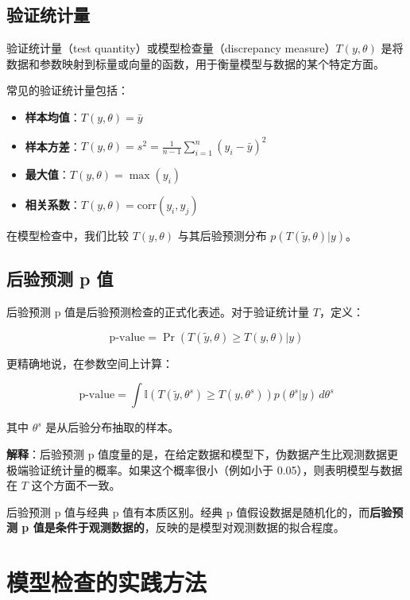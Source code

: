 \subsection{验证统计量}

验证统计量（test quantity）或模型检查量（discrepancy measure）$T(y, \theta)$ 是将数据和参数映射到标量或向量的函数，用于衡量模型与数据的某个特定方面。

常见的验证统计量包括：

\begin{itemize}
  \item \textbf{样本均值}：$T(y, \theta) = \bar{y}$
  \item \textbf{样本方差}：$T(y, \theta) = s^2 = \frac{1}{n-1}\sum_{i=1}^n (y_i - \bar{y})^2$
  \item \textbf{最大值}：$T(y, \theta) = \max(y_i)$
  \item \textbf{相关系数}：$T(y, \theta) = \text{corr}(y_i, y_j)$
\end{itemize}

在模型检查中，我们比较 $T(y, \theta)$ 与其后验预测分布 $p(T(\tilde{y}, \theta) | y)$。

\subsection{后验预测 p 值}

后验预测 p 值是后验预测检查的正式化表述。对于验证统计量 $T$，定义：

\[
\text{p-value} = \Pr(T(\tilde{y}, \theta) \geq T(y, \theta) | y)
\]

更精确地说，在参数空间上计算：

\[
\text{p-value} = \int \mathbb{I}(T(\tilde{y}, \theta^s) \geq T(y, \theta^s)) p(\theta^s | y) \, d\theta^s
\]

其中 $\theta^s$ 是从后验分布抽取的样本。

\textbf{解释}：后验预测 p 值度量的是，在给定数据和模型下，伪数据产生比观测数据更极端验证统计量的概率。如果这个概率很小（例如小于 0.05），则表明模型与数据在 $T$ 这个方面不一致。

\begin{Remark}
  后验预测 p 值与经典 p 值有本质区别。经典 p 值假设数据是随机化的，而\textbf{后验预测 p 值是条件于观测数据的}，反映的是模型对观测数据的拟合程度。
\end{Remark}

\section{模型检查的实践方法}

